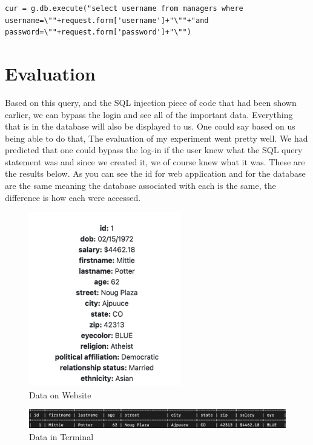 \bigskip
\bigskip
\begin{lstlisting}
cur = g.db.execute("select username from managers where username=\""+request.form['username']+"\""+"and password=\""+request.form['password']+"\"")
\end{lstlisting}
\bigskip
\bigskip


\section{Evaluation}

Based on this query, and the SQL injection piece of code that had been shown earlier, we
can bypass the login and see all of the important data. Everything
that is in the database will also be displayed to us. One could say based on us being
able to do that, The evaluation of my experiment went pretty well. We had predicted
that one could bypass the log-in if the user knew what the SQL query statement was and since
we created it, we of course knew what it was. These are the results below. As you can see the id for web application and for the database are the same meaning the database associated with each is the same, the difference is how each were accessed.

\bigskip
\bigskip
\begin{figure}[hbt!]
\centering
\includegraphics[height=3in]{../images/access-1.png}%
\caption{Data on Website}
\label{fig:data on website}
\end{figure}
\bigskip

\bigskip
\begin{figure}[hbt!]
\centering
\includegraphics[width=6in]{../images/access-2.png}%
\caption{Data in Terminal}
\label{fig:data in terminal}
\end{figure}
\bigskip
\bigskip



